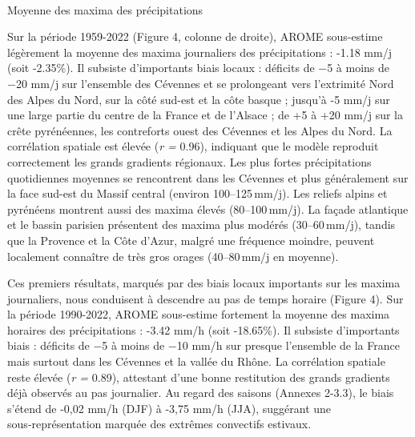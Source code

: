 \documentclass[
  article,
  nofooter,
  noheadings]{jss}
\makeatletter
\let\oldparagraph\paragraph
\renewcommand{\paragraph}{
    \@ifstar
      \xxxParagraphStar
      \xxxParagraphNoStar
  }
\newcommand{\xxxParagraphStar}[1]{\oldparagraph*{#1}\mbox{}}
\newcommand{\xxxParagraphNoStar}[1]{\oldparagraph{#1}\mbox{}}
\makeatother
\begin{document}

\paragraph{Moyenne des maxima des
précipitations}\label{moyenne-des-maxima-des-pruxe9cipitations}

Sur la période 1959-2022 (Figure 4, colonne de droite), AROME
sous-estime légèrement la moyenne des maxima journaliers des
précipitations : -1.18 mm/j (soit -2.35\%). Il subsiste d'importants
biais locaux : déficits de −5 à moins de −20 mm/j sur l'ensemble des
Cévennes et se prolongeant vers l'extrimité Nord des Alpes du Nord, sur
la côté sud-est et la côte basque ; jusqu'à -5 mm/j sur une large partie
du centre de la France et de l'Alsace ; de +5 à +20 mm/j sur la crête
pyrénéennes, les contreforts ouest des Cévennes et les Alpes du Nord. La
corrélation spatiale est élevée (\emph{r =} 0.96), indiquant que le
modèle reproduit correctement les grands gradients régionaux. Les plus
fortes précipitations quotidiennes moyennes se rencontrent dans les
Cévennes et plus généralement sur la face sud-est du Massif central
(environ 100--125\,mm/j). Les reliefs alpins et pyrénéens montrent aussi
des maxima élevés (80--100\,mm/j). La façade atlantique et le bassin
parisien présentent des maxima plus modérés (30--60\,mm/j), tandis que
la Provence et la Côte d'Azur, malgré une fréquence moindre, peuvent
localement connaître de très gros orages (40--80\,mm/j en moyenne).

\hfill\break

Ces premiers résultats, marqués par des biais locaux importants sur les
maxima journaliers, nous conduisent à descendre au pas de temps horaire
(Figure 4). Sur la période 1990-2022, AROME sous-estime fortement la
moyenne des maxima horaires des précipitations : -3.42 mm/h (soit
-18.65\%). Il subsiste d'importants biais : déficits de −5 à moins de
−10 mm/h sur presque l'ensemble de la France mais surtout dans les
Cévennes et la vallée du Rhône. La corrélation spatiale reste élevée
(\emph{r =} 0.89), attestant d'une bonne restitution des grands
gradients déjà observés au pas journalier. Au regard des saisons
(Annexes 2-3.3), le biais s'étend de -0,02 mm/h (DJF) à -3,75 mm/h
(JJA), suggérant une sous‑représentation marquée des extrêmes convectifs
estivaux.
\end{document}
